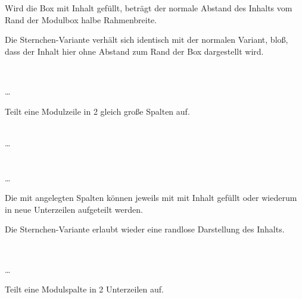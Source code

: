 Wird die Box mit Inhalt gefüllt, beträgt der normale Abstand des Inhalts
vom Rand der Modulbox halbe Rahmenbreite.

Die Sternchen-Variante  verhält sich identisch mit
der normalen Variant, bloß, dass der Inhalt hier ohne Abstand zum Rand der Box
dargestellt wird. 

\begin{minipage}{0.6\textwidth}
\begin{example}~\par
  \noindent{}
    \par
  \quad\dots\\
  \bigskip\par
  \noindent Teilt eine Modulzeile in 2 gleich große Spalten auf.
\end{example}
\end{minipage}
\hfill
\begin{minipage}{0.3\textwidth}\centering
\end{minipage}

\begin{Declaration}
    \\%
  \quad\dots\\
  \\
    \\%
  \quad\dots\\
\end{Declaration}

Die mit  angelegten Spalten können jeweils mit 
 mit Inhalt gefüllt oder wiederum in neue Unterzeilen
aufgeteilt werden.

Die Sternchen-Variante  erlaubt wieder eine
randlose Darstellung des Inhalts.

\begin{minipage}{0.6\textwidth}
\begin{example}~\par
  \noindent{}
    \par
  \quad\dots\\
  \bigskip\par
  \noindent Teilt eine Modulspalte in 2 Unterzeilen auf.
\end{example}
\end{minipage}
\hfill
\begin{minipage}{0.3\textwidth}\centering
\end{minipage}


